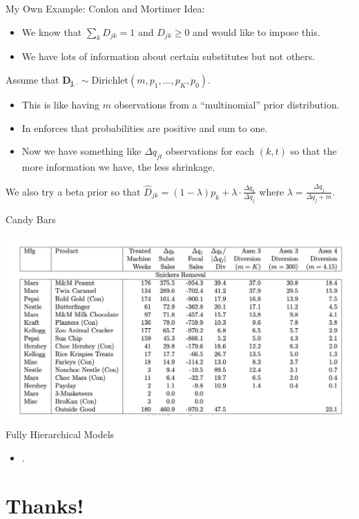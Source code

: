 \documentclass[xcolor=pdftex,dvipsnames,table,mathserif,aspectratio=169]{beamer}
\begin{document}
\begin{frame}{My Own Example: Conlon and Mortimer}
Idea:
\begin{itemize}
\item We know that $\sum_k D_{jk} =1$ and $D_{jk} \geq 0$ and would like to impose this.
\item We have lots of information about certain substitutes but not others.
\end{itemize}
Assume that $\mathbf{D_{j,\cdot}} \sim \text{Dirichlet}(m, p_1,\ldots,p_K,p_0)$.
\begin{itemize}
\item This is like having $m$ observations from a ``multinomial'' prior distribution.
\item In enforces that probabilities are positive and sum to one.
\item Now we have something like $\Delta q_{jt}$ observations for each $(k,t)$ so that the more information we have, the less shrinkage.
\end{itemize}
We also try a beta prior so that $\hat{D}_{jk} = (1-\lambda) p_k + \lambda\cdot \frac{\Delta q_k}{\Delta q_j}$ where $\lambda = \frac{\Delta q_j}{\Delta q_j + m}$.
\end{frame}


\begin{frame}[fragile]{Candy Bars}
\begin{center}
\includegraphics[height=0.8\textheight]{./resources/diversion.png}
\end{center}
\end{frame}

\begin{frame}{Fully Hierarchical Models}
\begin{itemize}
\item .
\end{itemize}

\end{frame}




\section*{Thanks!}
\end{document}
